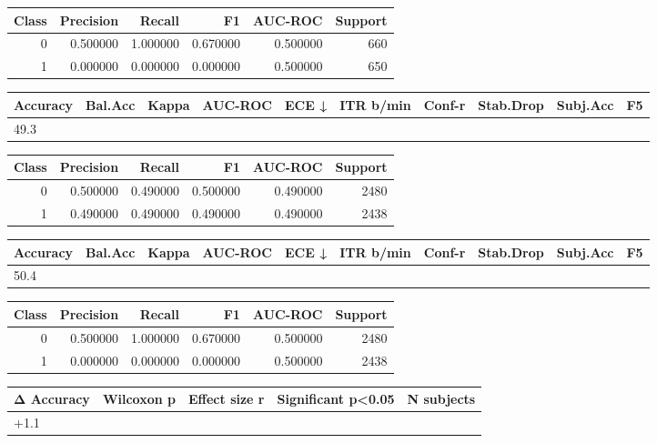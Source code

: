 \begin{tabular}{rrrrrr}
\toprule
Class & Precision & Recall & F1 & AUC-ROC & Support \\
\midrule
0 & 0.500000 & 1.000000 & 0.670000 & 0.500000 & 660 \\
1 & 0.000000 & 0.000000 & 0.000000 & 0.500000 & 650 \\
\bottomrule
\end{tabular}


\begin{tabular}{llrrrrrlll}
\toprule
Accuracy & Bal.Acc & Kappa & AUC-ROC & ECE ↓ & ITR b/min & Conf-r & Stab.Drop & Subj.Acc & F5 \\
\midrule
49.3%
\bottomrule
\end{tabular}


\begin{tabular}{rrrrrr}
\toprule
Class & Precision & Recall & F1 & AUC-ROC & Support \\
\midrule
0 & 0.500000 & 0.490000 & 0.500000 & 0.490000 & 2480 \\
1 & 0.490000 & 0.490000 & 0.490000 & 0.490000 & 2438 \\
\bottomrule
\end{tabular}


\begin{tabular}{llrrrrrlll}
\toprule
Accuracy & Bal.Acc & Kappa & AUC-ROC & ECE ↓ & ITR b/min & Conf-r & Stab.Drop & Subj.Acc & F5 \\
\midrule
50.4%
\bottomrule
\end{tabular}


\begin{tabular}{rrrrrr}
\toprule
Class & Precision & Recall & F1 & AUC-ROC & Support \\
\midrule
0 & 0.500000 & 1.000000 & 0.670000 & 0.500000 & 2480 \\
1 & 0.000000 & 0.000000 & 0.000000 & 0.500000 & 2438 \\
\bottomrule
\end{tabular}


\begin{tabular}{lrrll}
\toprule
Δ Accuracy & Wilcoxon p & Effect size r & Significant p<0.05 & N subjects \\
\midrule
+1.1%
\bottomrule
\end{tabular}


